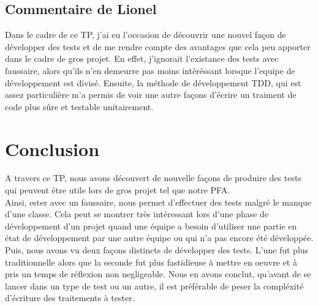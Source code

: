 \documentclass[a4paper,11pts]{article}
\begin{document}
\subsection{Commentaire de Lionel}

Dans le cadre de ce TP, j'ai eu l'occasion de découvrir une nouvel façon de développer des tests et de me rendre compte des avantages que cela peu apporter dans le cadre de gros projet. En effet, j'ignorait l'existance des tests avec faussaire, alors qu'ils n'en demeurre pas moins int\^eréssant lorsque l'equipe de développement est divisé. Ensuite, la méthode de développement TDD, qui est assez particulière m'a permis de voir une autre façons d'écrire un traiment de code plus s\^ure et testable unitairement.




\section{Conclusion}
A travers ce TP, nous avons découvert de nouvelle façons de produire des tests qui peuvent \^etre utile lors de gros projet tel que notre PFA.\\
Ainsi, ester avec un faussaire, nous permet d'effectuer des tests malgré le manque d'une classe. Cela peut se montrer très intéressant lors d'une phase de développement d'un projet quand une équipe a besoin d'utiliser une partie en état de développement par une autre équipe ou qui n'a pas encore été développée.
\\
Puis, nous avons vu deux façons distincts de développer des tests. L'une fut plus traditionnelle alors que la seconde fut plus fastidieuse à mettre en oeuvre et à pris un temps de réflexion non negligeable. Nous en avons conclut, qu'avant de se lancer dans un type de test ou un autre, il est préférable de peser la compléxité d'écriture des traitements à tester.
    
\end{document}
